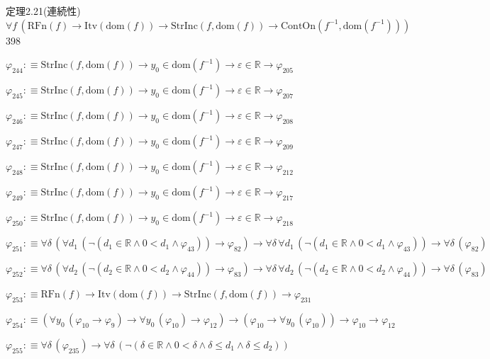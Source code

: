 \begin{fullproof}{定理2.21(連続性)}{$\forall f\,(\mathrm{RFn}(f) \to \mathrm{Itv}(\mathrm{dom}(f)) \to \mathrm{StrInc}(f,\mathrm{dom}(f)) \to \mathrm{ContOn}(f^{-1},\mathrm{dom}(f^{-1})))$}{398}
\begin{abbrevlist}
\item $\varphi_{244} :\equiv \mathrm{StrInc}(f,\mathrm{dom}(f)) \to y_{0} \in \mathrm{dom}(f^{-1}) \to \varepsilon \in \mathbb{R} \to \varphi_{205}$
\item $\varphi_{245} :\equiv \mathrm{StrInc}(f,\mathrm{dom}(f)) \to y_{0} \in \mathrm{dom}(f^{-1}) \to \varepsilon \in \mathbb{R} \to \varphi_{207}$
\item $\varphi_{246} :\equiv \mathrm{StrInc}(f,\mathrm{dom}(f)) \to y_{0} \in \mathrm{dom}(f^{-1}) \to \varepsilon \in \mathbb{R} \to \varphi_{208}$
\item $\varphi_{247} :\equiv \mathrm{StrInc}(f,\mathrm{dom}(f)) \to y_{0} \in \mathrm{dom}(f^{-1}) \to \varepsilon \in \mathbb{R} \to \varphi_{209}$
\item $\varphi_{248} :\equiv \mathrm{StrInc}(f,\mathrm{dom}(f)) \to y_{0} \in \mathrm{dom}(f^{-1}) \to \varepsilon \in \mathbb{R} \to \varphi_{212}$
\item $\varphi_{249} :\equiv \mathrm{StrInc}(f,\mathrm{dom}(f)) \to y_{0} \in \mathrm{dom}(f^{-1}) \to \varepsilon \in \mathbb{R} \to \varphi_{217}$
\item $\varphi_{250} :\equiv \mathrm{StrInc}(f,\mathrm{dom}(f)) \to y_{0} \in \mathrm{dom}(f^{-1}) \to \varepsilon \in \mathbb{R} \to \varphi_{218}$
\item $\varphi_{251} :\equiv \forall \delta\,(\forall d_{1}\,(\neg (d_{1} \in \mathbb{R} \land 0 < d_{1} \land \varphi_{43})) \to \varphi_{82}) \to \forall \delta\,\forall d_{1}\,(\neg (d_{1} \in \mathbb{R} \land 0 < d_{1} \land \varphi_{43})) \to \forall \delta\,(\varphi_{82})$
\item $\varphi_{252} :\equiv \forall \delta\,(\forall d_{2}\,(\neg (d_{2} \in \mathbb{R} \land 0 < d_{2} \land \varphi_{44})) \to \varphi_{83}) \to \forall \delta\,\forall d_{2}\,(\neg (d_{2} \in \mathbb{R} \land 0 < d_{2} \land \varphi_{44})) \to \forall \delta\,(\varphi_{83})$
\item $\varphi_{253} :\equiv \mathrm{RFn}(f) \to \mathrm{Itv}(\mathrm{dom}(f)) \to \mathrm{StrInc}(f,\mathrm{dom}(f)) \to \varphi_{231}$
\item $\varphi_{254} :\equiv (\forall y_{0}\,(\varphi_{10} \to \varphi_{9}) \to \forall y_{0}\,(\varphi_{10}) \to \varphi_{12}) \to (\varphi_{10} \to \forall y_{0}\,(\varphi_{10})) \to \varphi_{10} \to \varphi_{12}$
\item $\varphi_{255} :\equiv \forall \delta\,(\varphi_{235}) \to \forall \delta\,(\neg (\delta \in \mathbb{R} \land 0 < \delta \land \delta \leq d_{1} \land \delta \leq d_{2}))$

\end{abbrevlist}
\end{fullproof}

